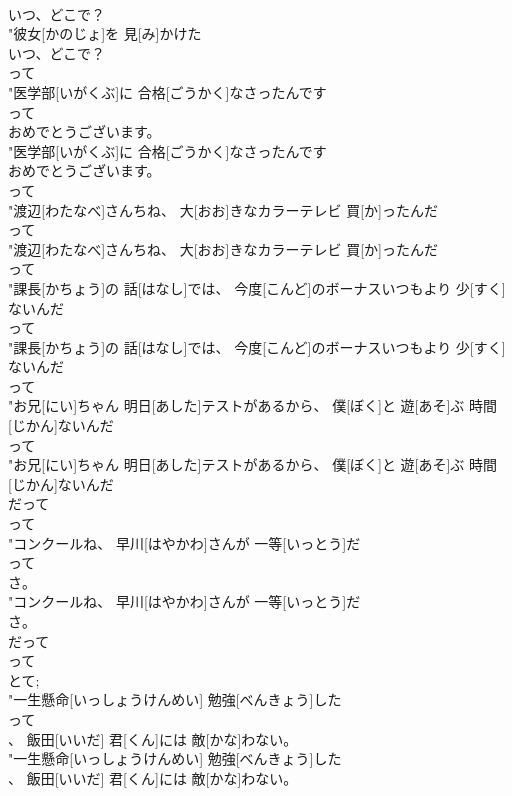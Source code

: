 \documentclass[8pt]{extreport}
\begin{document}
\begin{CJK}{UTF8}{min}
\\	いつ、どこで？
\\	"彼女[かのじょ]を 見[み]かけた
\\	いつ、どこで？
\\	って
\\	"医学部[いがくぶ]に 合格[ごうかく]なさったんです
\\	って
\\	おめでとうございます。
\\	"医学部[いがくぶ]に 合格[ごうかく]なさったんです
\\	おめでとうございます。
\\	って
\\	"渡辺[わたなべ]さんちね、 大[おお]きなカラーテレビ 買[か]ったんだ
\\	って
\\	"渡辺[わたなべ]さんちね、 大[おお]きなカラーテレビ 買[か]ったんだ
\\	って
\\	"課長[かちょう]の 話[はなし]では、 今度[こんど]のボーナスいつもより 少[すく]ないんだ
\\	って
\\	"課長[かちょう]の 話[はなし]では、 今度[こんど]のボーナスいつもより 少[すく]ないんだ
\\	って
\\	"お兄[にい]ちゃん 明日[あした]テストがあるから、 僕[ぼく]と 遊[あそ]ぶ 時間[じかん]ないんだ
\\	って
\\	"お兄[にい]ちゃん 明日[あした]テストがあるから、 僕[ぼく]と 遊[あそ]ぶ 時間[じかん]ないんだ
\\	だって	
\\	って
\\	"コンクールね、 早川[はやかわ]さんが 一等[いっとう]だ
\\	って
\\	さ。
\\	"コンクールね、 早川[はやかわ]さんが 一等[いっとう]だ
\\	さ。
\\	だって	
\\	って
\\	とて; 
\\	"一生懸命[いっしょうけんめい] 勉強[べんきょう]した
\\	って
\\	、 飯田[いいだ] 君[くん]には 敵[かな]わない。
\\	"一生懸命[いっしょうけんめい] 勉強[べんきょう]した
\\	、 飯田[いいだ] 君[くん]には 敵[かな]わない。

\end{CJK}
\end{document}
